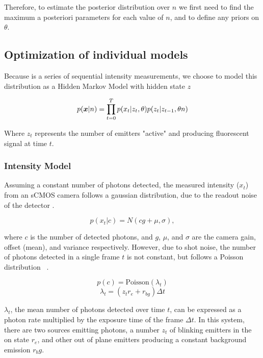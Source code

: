 Therefore, to estimate the posterior distribution over $n$ we first need to 
find the maximum a posteriori parameters for each value of $n$,
and to define any priors on $\theta$.

\subsection{Optimization of individual models}

Because \trace is a series of sequential intensity measurements, 
we choose to model this distribution as a Hidden Markov Model with hidden state $z$

\begin{equation}
  p(\bm{x}| n) = \prod_{t=0}^{T} p(x_{t} | z_{t}, \theta) p(z_{t} | z_{t-1}, \theta n)
  \label{eq:method:base}
\end{equation}

Where $z_{t}$ represents the number of emitters "active" and producing 
fluorescent signal at time $t$.

\subsubsection{Intensity Model}
Assuming a constant number of photons detected, the measured intensity ($x_{t}$) from an sCMOS
  camera follows a gaussian distribution, due to the readout noise of the detector .

  \begin{equation}
    p(x_{t}|c) = N(cg + \mu, \sigma),
    \label{eq:read_out}
  \end{equation}

  where $c$ is the number of detected photons, and $g$, $\mu$, and $\sigma$ are the
  camera gain, offset (mean), and variance respectively.
  However, due to shot noise, the number of photons detected in a single frame $t$ is not constant, 
  but follows a Poisson distribution~\cite{mehta_poisson_2016} \figref{}.

  \begin{equation}
    p(c) = \text{Poisson}(\lambda_{t})
    \label{eq:shot}
  \end{equation}
  \begin{equation*}
    \lambda_{t} = (z_{t}r_e + r_{bg}) \Delta t
  \end{equation*}

  $\lambda_{t}$, the mean number of photons detected over time $t$, 
    can be expressed as a photon rate multiplied by the exposure time of the frame $\Delta t$.
    In this system, there are two sources emitting photons, a number $z_t$ of blinking emitters in the on state $r_e$, and 
    other out of plane emitters producing a constant background emission $r_bg$.

